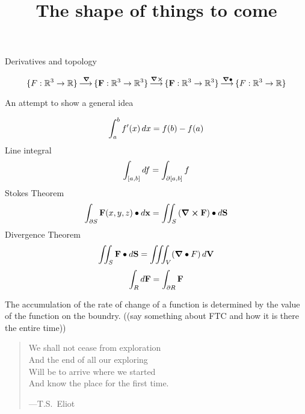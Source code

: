 \documentclass{ximera}
\title[Dig-In:]{The shape of things to come}
\newcommand{\lto}{\mathop{\longrightarrow\,}\limits}
\begin{document}
\begin{abstract}
\end{abstract}
\maketitle


Derivatives and topology

\[
\{F:\R^3 \to \R\} \lto^{\grad} \{\vec{F}: \R^3 \to \R^3\} \lto^{\curl}
\{\vec{F}:\R^3 \to \R^3\} \lto^{\divergence} \{F:\R^3 \to \R\}
\]

An attempt to show a general idea

\[
\int_a^b f'(x) \mathop{}\!d x = f(b) - f(a)
\]
Line integral
\[
\int_{[a,b]} \mathop{}\!d f = \int_{\partial[a,b]} f
\]
Stokes Theorem
\[
\int_{\partial S} \mathbf{F}(x,y,z)\bullet \mathop{}\!d \mathbf{x} = \iint_S \left(\boldsymbol\nabla\boldsymbol\times\mathbf{F}\right)\bullet \mathop{}\!d \mathbf{S}
\]
Divergence Theorem
\[
\iint_S \mathbf{F}\bullet \mathop{}\!d \mathbf{S} = \iiint_V (\boldsymbol\nabla\bullet F) \mathop{}\!d \mathbf{V}
\]
\[
\int_R \mathop{}\!d \mathbf{F} = \int_{\partial R} \mathbf{F}
\]

The accumulation of the rate of change of a function is determined by
the value of the function on the boundry. ((say something about FTC and how it is there the entire time))

\begin{quote}
  We shall not cease from exploration\\
  And the end of all our exploring \\
  Will be to arrive where we started \\
  And know the place for the first time.

  \hfill ---T.S.\ Eliot
\end{quote}
\end{document}
